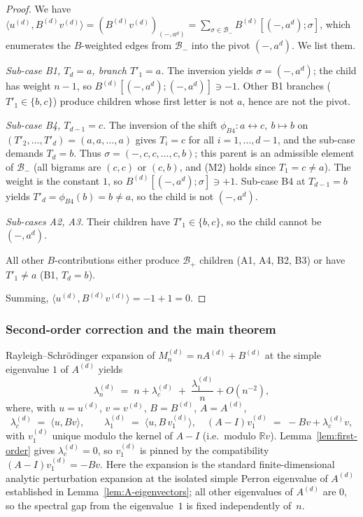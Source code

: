 \documentclass{amsart}
\theoremstyle{definition}
\theoremstyle{remark}
\newcommand{\R}{\mathbb{R}}
\begin{document}
\begin{proof}
We have
$\langle u^{(d)}, B^{(d)} v^{(d)}\rangle
  = (B^{(d)} v^{(d)})_{(-, a^d)}
  = \sum_{\sigma \in \mathcal{B}_-}
      B^{(d)}[(-, a^d); \sigma]$,
which enumerates the $B$-weighted edges from $\mathcal{B}_-$ into
the pivot $(-, a^d)$.  We list them.

\emph{Sub-case B1, $T_d = a$, branch $T'_1 = a$.}  The inversion
yields $\sigma = (-, a^d)$; the child has weight $n - 1$, so
$B^{(d)}[(-, a^d); (-, a^d)] \ni -1$.  Other B1 branches
($T'_1 \in \{b, c\}$) produce children whose first letter is
not $a$, hence are not the pivot.

\emph{Sub-case B4, $T_{d-1} = c$.}  The inversion of the shift
$\phi_{B4}\colon a \leftrightarrow c,\ b \mapsto b$ on
$(T'_2, \ldots, T'_d) = (a, a, \ldots, a)$ gives
$T_i = c$ for all $i = 1, \ldots, d-1$, and the sub-case demands
$T_d = b$.  Thus $\sigma = (-, c, c, \ldots, c, b)$; this parent
is an admissible element of $\mathcal{B}_-$ (all bigrams are
$(c, c)$ or $(c, b)$, and (M2) holds since $T_1 = c \neq a$).
The weight is the constant $1$, so $B^{(d)}[(-, a^d); \sigma]
\ni +1$.  Sub-case B4 at $T_{d-1} = b$ yields $T'_d = \phi_{B4}(b)
= b \neq a$, so the child is not $(-, a^d)$.

\emph{Sub-cases A2, A3.}  Their children have $T'_1 \in \{b, c\}$,
so the child cannot be $(-, a^d)$.

All other $B$-contributions either produce $\mathcal{B}_+$
children (A1, A4, B2, B3) or have $T'_1 \neq a$ (B1, $T_d = b$).

Summing, $\langle u^{(d)}, B^{(d)} v^{(d)}\rangle = -1 + 1 = 0$.
\end{proof}

\subsubsection{Second-order correction and the main theorem}
\label{sec:second-order}

Rayleigh--Schr\"{o}dinger expansion of $M_n^{(d)} = n A^{(d)} + B^{(d)}$
at the simple eigenvalue $1$ of $A^{(d)}$ yields
\[
  \lambda_n^{(d)} \;=\; n + \lambda_c^{(d)}
    \;+\; \frac{\lambda_1^{(d)}}{n} + O(n^{-2}),
\]
where, with $u = u^{(d)}$, $v = v^{(d)}$,
$B = B^{(d)}$, $A = A^{(d)}$,
\begin{equation}\label{eq:rs-coefs}
  \lambda_c^{(d)} \;=\; \langle u, B v\rangle,
  \qquad
  \lambda_1^{(d)} \;=\; \langle u, B\, v^{(d)}_1 \rangle,
  \quad
  (A - I) v^{(d)}_1 \;=\; -B v + \lambda_c^{(d)} v,
\end{equation}
with $v^{(d)}_1$ unique modulo the kernel of $A - I$ (i.e.\ modulo
$\R v$).  Lemma~\ref{lem:first-order} gives $\lambda_c^{(d)} = 0$,
so $v^{(d)}_1$ is pinned by the compatibility $(A - I) v^{(d)}_1
= -B v$.
Here the expansion is the standard finite-dimensional analytic
perturbation expansion at the isolated simple Perron eigenvalue
of $A^{(d)}$ established in Lemma~\ref{lem:A-eigenvectors}; all
other eigenvalues of $A^{(d)}$ are $0$, so the spectral gap from
the eigenvalue~$1$ is fixed independently of~$n$.
\end{document}
